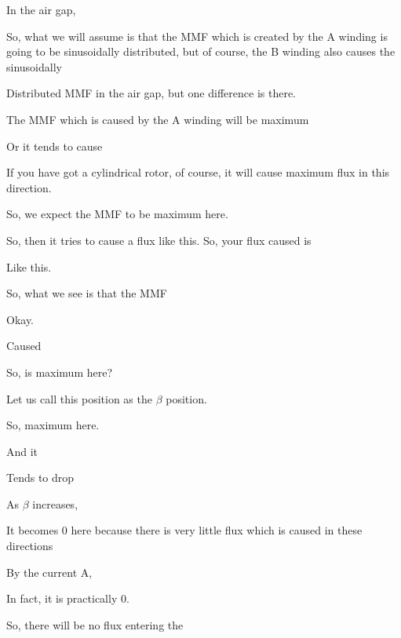 \documentclass{article}
\begin{document}
In the air gap,

So, what we will assume is that the MMF which is created by the A winding is going to be sinusoidally distributed, but of course, the B winding also causes the sinusoidally

Distributed MMF in the air gap, but one difference is there.

The MMF which is caused by the A winding will be maximum

Or it tends to cause

If you have got a cylindrical rotor, of course, it will cause maximum flux in this direction.

So, we expect the MMF to be maximum here.



So, then it tries to cause a flux like this. So, your flux caused is

Like this.

So, what we see is that the MMF





Okay.

Caused









So, is maximum here?

Let us call this position as the $\beta$ position.

So, maximum here.

And it

Tends to drop

As $\beta$ increases,

It becomes 0 here because there is very little flux which is caused in these directions

By the current A,

In fact, it is practically 0.

So, there will be no flux entering the
\end{document}
